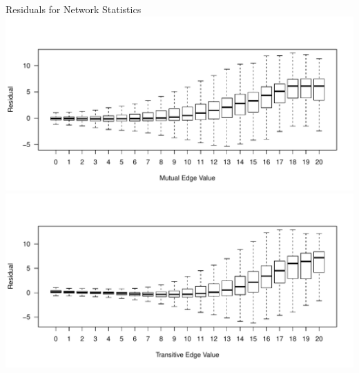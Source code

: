 \documentclass{beamer}
\begin{document}
\begin{frame}{Residuals for Network Statistics}
\centering
  \includegraphics[scale=.45, clip=true, trim=0cm .5cm 0cm 1.9cm]{slides_figures/mutualBoxplot.pdf}\vfill
   \includegraphics[scale=.45, clip=true, trim=0cm .5cm 0cm 1.9cm]{slides_figures/transitiveBoxplot.pdf}


\end{frame}
\end{document}

